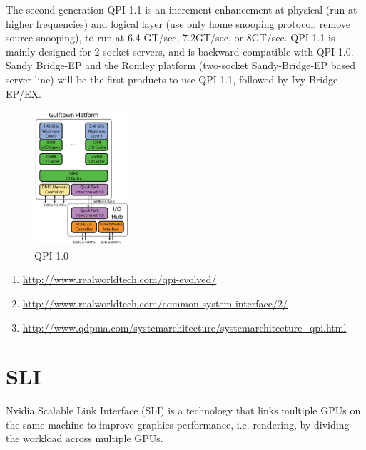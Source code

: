 The second generation QPI 1.1 is an increment enhancement at physical (run at
higher frequencies) and logical layer (use only home snooping protocol, remove
source snooping), to run at 6.4 GT/sec, 7.2GT/sec, or 8GT/sec. QPI 1.1 is mainly
designed for 2-socket servers, and is backward compatible with QPI 1.0. Sandy
Bridge-EP and the Romley platform (two-socket Sandy-Bridge-EP based server line)
will be the first products to use QPI 1.1, followed by Ivy Bridge-EP/EX.

\begin{figure}[hbt]
  \centerline{\includegraphics[height=5cm,
    angle=0]{./images/QPI_1.0.eps}}
  \caption{QPI 1.0}
  \label{fig:QPI_1.0}
\end{figure}


\begin{enumerate}
  \item \url{http://www.realworldtech.com/qpi-evolved/}
  \item \url{http://www.realworldtech.com/common-system-interface/2/}
  \item
  \url{http://www.qdpma.com/systemarchitecture/systemarchitecture_qpi.html}
\end{enumerate}





\section{SLI}
\label{sec:SLI}

Nvidia Scalable Link Interface (SLI) is a technology that links multiple GPUs on
the same machine to improve graphics performance, i.e. rendering, by dividing
the workload across multiple GPUs.

